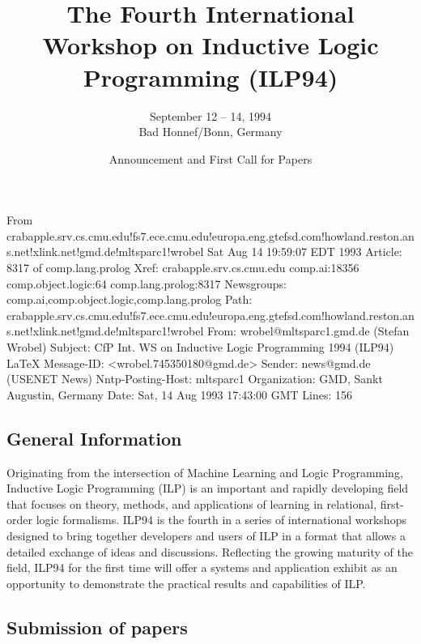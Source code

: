 From crabapple.srv.cs.cmu.edu!fs7.ece.cmu.edu!europa.eng.gtefsd.com!howland.reston.ans.net!xlink.net!gmd.de!mltsparc1!wrobel Sat Aug 14 19:59:07 EDT 1993
Article: 8317 of comp.lang.prolog
Xref: crabapple.srv.cs.cmu.edu comp.ai:18356 comp.object.logic:64 comp.lang.prolog:8317
Newsgroups: comp.ai,comp.object.logic,comp.lang.prolog
Path: crabapple.srv.cs.cmu.edu!fs7.ece.cmu.edu!europa.eng.gtefsd.com!howland.reston.ans.net!xlink.net!gmd.de!mltsparc1!wrobel
From: wrobel@mltsparc1.gmd.de (Stefan Wrobel)
Subject: CfP Int. WS on Inductive Logic Programming 1994 (ILP94) LaTeX
Message-ID: <wrobel.745350180@gmd.de>
Sender: news@gmd.de (USENET News)
Nntp-Posting-Host: mltsparc1
Organization: GMD, Sankt Augustin, Germany
Date: Sat, 14 Aug 1993 17:43:00 GMT
Lines: 156


\title{The Fourth International Workshop on 
Inductive Logic Programming (ILP94)}
\date{Announcement and First Call for Papers}
\author{September 12 -- 14, 1994\\
Bad Honnef/Bonn, Germany}

\maketitle
\subsection*{General Information}

Originating from the intersection of Machine Learning and Logic
Programming, Inductive Logic Programming (ILP) is an important and
rapidly developing field that focuses on theory, methods, and
applications of learning in relational, first-order logic formalisms.
ILP94 is the fourth in a series of international workshops designed to
bring together developers and users of ILP in a format that allows a
detailed exchange of ideas and discussions.  Reflecting the growing
maturity of the field, ILP94 for the first time will offer a systems
and application exhibit as an opportunity to demonstrate the practical
results and capabilities of ILP.

\subsection*{Submission of papers}

